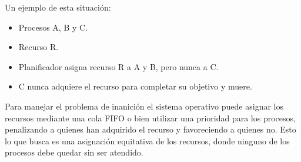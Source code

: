 Un ejemplo de esta situación:
\begin{itemize}
	\item Procesos A, B y C.
	\item Recurso R.
	\item Planificador asigna recurso R a A y B, pero nunca a C.
	\item C nunca adquiere el recurso para completar su objetivo y muere.
\end{itemize}

Para manejar el problema de inanición el sistema operativo puede asignar los
recursos mediante una cola FIFO o bien utilizar una prioridad para los procesos,
penalizando a quienes han adquirido el recurso y favoreciendo a quienes no. Esto
lo que busca es una asignación equitativa de los recursos, donde ninguno de los
procesos debe quedar sin ser atendido.

